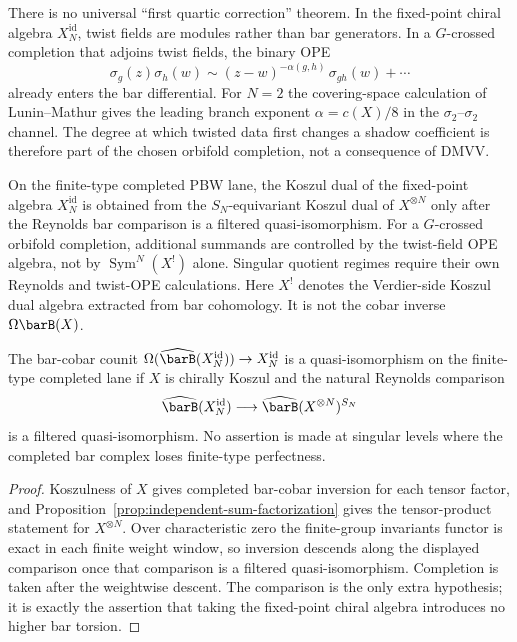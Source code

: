 \begin{remark}
\label{rem:symn-twist-higher-degree}
There is no universal ``first quartic correction'' theorem. In the
fixed-point chiral algebra $X_N^{\mathrm{id}}$, twist fields are
modules rather than bar generators. In a $G$-crossed completion that
adjoins twist fields, the binary OPE
\[
 \sigma_g(z)\sigma_h(w)\sim
 (z-w)^{-\alpha(g,h)}\,\sigma_{gh}(w)+\cdots
\]
already enters the bar differential. For $N=2$ the covering-space
calculation of Lunin--Mathur \cite{LuninMathur2001} gives the leading
branch exponent $\alpha=c(X)/8$ in the $\sigma_2$--$\sigma_2$
channel. The degree at which twisted data first changes a shadow
coefficient is therefore part of the chosen orbifold completion, not
a consequence of DMVV.
\end{remark}

\begin{conjecture}\label{conj:symn-koszul-dual}
On the finite-type completed PBW lane, the Koszul dual of the
fixed-point algebra $X_N^{\mathrm{id}}$ is obtained from the
$S_N$-equivariant Koszul dual of $X^{\otimes N}$ only after the
Reynolds bar comparison is a filtered quasi-isomorphism. For a
$G$-crossed orbifold completion, additional summands are controlled
by the twist-field OPE algebra, not by $\operatorname{Sym}^N(X^!)$
alone. Singular quotient regimes require their own Reynolds and
twist-OPE calculations.
Here $X^!$ denotes the Verdier-side Koszul dual algebra extracted
from bar cohomology. It is not the cobar inverse
$\Omega\barB(X)$.
\end{conjecture}

\begin{proposition}\label{prop:symn-inversion}
The bar-cobar counit
$\Omega(\widehat{\barB}(X_N^{\mathrm{id}})) \to X_N^{\mathrm{id}}$
is a quasi-isomorphism on the finite-type completed lane if $X$ is
chirally Koszul and the natural Reynolds comparison
\[
 \widehat{\barB}(X_N^{\mathrm{id}})
 \longrightarrow
 \widehat{\barB}(X^{\otimes N})^{S_N}
\]
is a filtered quasi-isomorphism. No assertion is made at singular
levels where the completed bar complex loses finite-type
perfectness.
\end{proposition}

\begin{proof}
Koszulness of $X$ gives completed bar-cobar inversion for each
tensor factor, and Proposition~\ref{prop:independent-sum-factorization}
gives the tensor-product statement for $X^{\otimes N}$. Over
characteristic zero the finite-group invariants functor is exact in
each finite weight window, so inversion descends along the displayed
comparison once that comparison is a filtered quasi-isomorphism.
Completion is taken after the weightwise descent. The comparison is
the only extra hypothesis; it is exactly the assertion that taking
the fixed-point chiral algebra introduces no higher bar torsion.
\end{proof}


